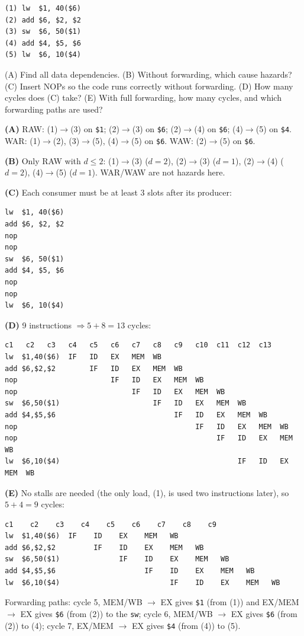 \documentclass[11pt]{article}
\begin{document}
\begin{exercise}\label{e:lecture}
\leavevmode
\begin{lstlisting}
(1) lw  $1, 40($6)
(2) add $6, $2, $2
(3) sw  $6, 50($1)
(4) add $4, $5, $6
(5) lw  $6, 10($4)
\end{lstlisting}
(A) Find all data dependencies. (B) Without forwarding, which cause hazards?
(C) Insert NOPs so the code runs correctly without forwarding. (D) How many
cycles does (C) take? (E) With full forwarding, how many cycles, and which
forwarding paths are used?
\end{exercise}
\begin{solution}
\textbf{(A)} RAW: (1)$\to$(3) on \texttt{\$1}; (2)$\to$(3) on \texttt{\$6};
(2)$\to$(4) on \texttt{\$6}; (4)$\to$(5) on \texttt{\$4}.
WAR: (1)$\to$(2), (3)$\to$(5), (4)$\to$(5) on \texttt{\$6}.
WAW: (2)$\to$(5) on \texttt{\$6}.

\textbf{(B)} Only RAW with $d\le2$: (1)$\to$(3) ($d=2$), (2)$\to$(3)
($d=1$), (2)$\to$(4) ($d=2$), (4)$\to$(5) ($d=1$). WAR/WAW are not hazards
here.

\textbf{(C)} Each consumer must be at least 3 slots after its producer:
\begin{lstlisting}
lw  $1, 40($6)
add $6, $2, $2
nop
nop
sw  $6, 50($1)
add $4, $5, $6
nop
nop
lw  $6, 10($4)
\end{lstlisting}
\textbf{(D)} 9 instructions $\Rightarrow 5 + 8 = 13$ cycles:
\begin{lstlisting}[basicstyle=\ttfamily\scriptsize,keywords={}]
               c1   c2   c3   c4   c5   c6   c7   c8   c9   c10  c11  c12  c13
lw  $1,40($6)  IF   ID   EX   MEM  WB
add $6,$2,$2        IF   ID   EX   MEM  WB
nop                      IF   ID   EX   MEM  WB
nop                           IF   ID   EX   MEM  WB
sw  $6,50($1)                      IF   ID   EX   MEM  WB
add $4,$5,$6                            IF   ID   EX   MEM  WB
nop                                          IF   ID   EX   MEM  WB
nop                                               IF   ID   EX   MEM  WB
lw  $6,10($4)                                          IF   ID   EX   MEM  WB
\end{lstlisting}

\textbf{(E)} No stalls are needed (the only load, (1), is used two
instructions later), so $5+4 = 9$ cycles:
\begin{lstlisting}[basicstyle=\ttfamily\footnotesize,keywords={}]
               c1    c2    c3    c4    c5    c6    c7    c8    c9
lw  $1,40($6)  IF    ID    EX    MEM   WB
add $6,$2,$2         IF    ID    EX    MEM   WB
sw  $6,50($1)              IF    ID    EX    MEM   WB
add $4,$5,$6                     IF    ID    EX    MEM   WB
lw  $6,10($4)                          IF    ID    EX    MEM   WB
\end{lstlisting}
Forwarding paths: cycle 5, MEM/WB $\to$ EX gives \texttt{\$1} (from (1)) and
EX/MEM $\to$ EX gives \texttt{\$6} (from (2)) to the \texttt{sw}; cycle 6,
MEM/WB $\to$ EX gives \texttt{\$6} (from (2)) to (4); cycle 7, EX/MEM $\to$
EX gives \texttt{\$4} (from (4)) to (5).
\end{solution}
\end{document}
